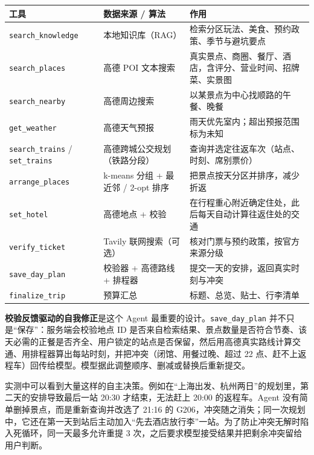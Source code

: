 \documentclass[a4paper]{article}
\newcommand{\thead}[1]{\textbf{#1}}
\newenvironment{doctable}[1]
  {\par\small\renewcommand{\arraystretch}{1.35}\setlength{\LTpre}{6pt}\setlength{\LTpost}{8pt}%
   \begin{longtable}{#1}\toprule\rowcolor{paperdeep}}
  {\bottomrule\end{longtable}}
\newcommand{\code}[1]{\texttt{\textcolor{pine}{#1}}}
\begin{document}
\begin{doctable}{>{\raggedright\arraybackslash}p{\dimexpr0.310\linewidth-2\tabcolsep\relax}>{\raggedright\arraybackslash}p{\dimexpr0.263\linewidth-2\tabcolsep\relax}>{\raggedright\arraybackslash}p{\dimexpr0.427\linewidth-2\tabcolsep\relax}}
\thead{工具} & \thead{数据来源 / 算法} & \thead{作用} \\ \midrule
\endhead
\code{search\_knowledge} & 本地知识库（RAG） & 检索分区玩法、美食、预约政策、季节与避坑要点 \\
\code{search\_places} & 高德 POI 文本搜索 & 真实景点、商圈、餐厅、酒店，含评分、营业时间、招牌菜、实景图 \\
\code{search\_nearby} & 高德周边搜索 & 以某景点为中心找顺路的午餐、晚餐 \\
\code{get\_weather} & 高德天气预报 & 雨天优先室内；超出预报范围标为未知 \\
\code{search\_trains} / \code{set\_trains} & 高德跨城公交规划（铁路分段） & 查询并选定往返车次（站点、时刻、席别票价） \\
\code{arrange\_places} & k-means 分组 + 最近邻 / 2-opt 排序 & 把景点按天分区并排序，减少折返 \\
\code{set\_hotel} & 高德地点 + 校验 & 在行程重心附近确定住处，此后每天自动计算往返住处的交通 \\
\code{verify\_ticket} & Tavily 联网搜索（可选） & 核对门票与预约政策，按官方来源分级 \\
\code{save\_day\_plan} & 校验器 + 高德路线 + 排程器 & 提交一天的安排，返回真实时刻与冲突 \\
\code{finalize\_trip} & 预算汇总 & 标题、总览、贴士、行李清单 \\
\end{doctable}

\textbf{校验反馈驱动的自我修正}是这个 Agent 最重要的设计。\texttt{save\_day\_plan} 并不只是``保存''：服务端会校验地点 ID
是否来自检索结果、景点数量是否符合节奏、该天必需的正餐是否齐全、用户锁定的站点是否保留，然后用高德真实路线计算交通、用排程器算出每站时刻，并把冲突（闭馆、用餐过晚、超过 22
点、赶不上返程车）回传给模型。模型据此调整顺序、删减或替换后重新提交。

实测中可以看到大量这样的自主决策。例如在``上海出发、杭州两日''的规划里，第二天的安排导致最后一站 20:30 才结束，无法赶上 20:00 的返程车。Agent 没有简单删掉景点，而是重新查询并改选了 21:16 的
G206，冲突随之消失；同一次规划中，它还在第一天到站后主动加入``先去酒店放行李''一站。为了防止冲突无解时陷入死循环，同一天最多允许重提 3 次，之后要求模型接受结果并把剩余冲突留给用户判断。
\end{document}
